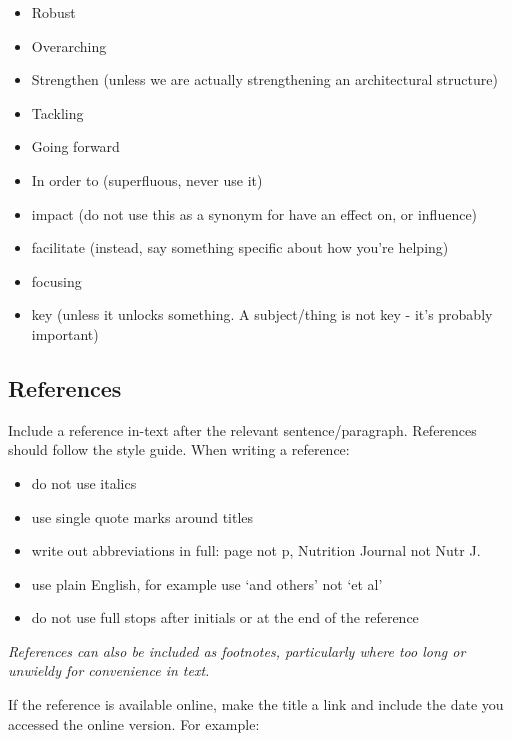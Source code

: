 \documentclass[
]{book}
\providecommand{\tightlist}{%
  \setlength{\itemsep}{0pt}\setlength{\parskip}{0pt}}
\begin{document}
\begin{itemize}
  \begin{itemize}
  \tightlist
  \item
    Robust
  \item
    Overarching
  \item
    Strengthen (unless we are actually strengthening an architectural structure)
  \item
    Tackling\\
  \item
    Going forward
  \item
    In order to (superfluous, never use it)
  \item
    impact (do not use this as a synonym for have an effect on, or influence)
  \item
    facilitate (instead, say something specific about how you're helping)
  \item
    focusing
  \item
    key (unless it unlocks something. A subject/thing is not key - it's probably important)
  \end{itemize}
\end{itemize}

\hypertarget{references}{%
\subsection{References}\label{references}}

Include a reference in-text after the relevant sentence/paragraph. References should follow the style guide. When writing a reference:

\begin{itemize}
\tightlist
\item
  do not use italics
\item
  use single quote marks around titles
\item
  write out abbreviations in full: page not p, Nutrition Journal not Nutr J.
\item
  use plain English, for example use `and others' not `et al'
\item
  do not use full stops after initials or at the end of the reference
\end{itemize}

\emph{References can also be included as footnotes, particularly where too long or unwieldy for convenience in text.}

If the reference is available online, make the title a link and include the date you accessed the online version. For example:
\end{document}
